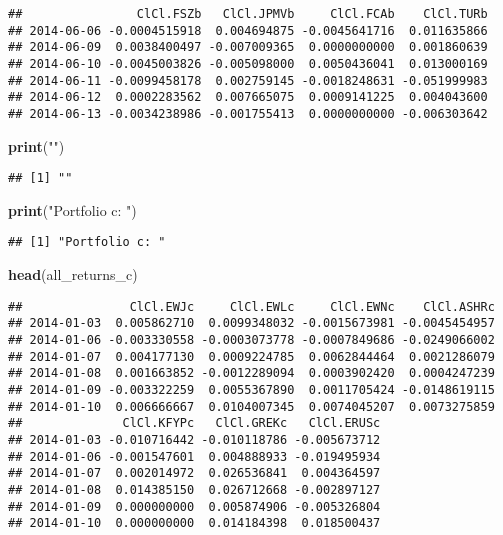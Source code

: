 \documentclass[]{article}
\newenvironment{Shaded}{\begin{snugshade}}{\end{snugshade}}
\newcommand{\KeywordTok}[1]{\textcolor[rgb]{0.13,0.29,0.53}{\textbf{#1}}}
\newcommand{\NormalTok}[1]{#1}
\newcommand{\StringTok}[1]{\textcolor[rgb]{0.31,0.60,0.02}{#1}}
\begin{document}
\begin{verbatim}
##                ClCl.FSZb   ClCl.JPMVb     ClCl.FCAb    ClCl.TURb
## 2014-06-06 -0.0004515918  0.004694875 -0.0045641716  0.011635866
## 2014-06-09  0.0038400497 -0.007009365  0.0000000000  0.001860639
## 2014-06-10 -0.0045003826 -0.005098000  0.0050436041  0.013000169
## 2014-06-11 -0.0099458178  0.002759145 -0.0018248631 -0.051999983
## 2014-06-12  0.0002283562  0.007665075  0.0009141225  0.004043600
## 2014-06-13 -0.0034238986 -0.001755413  0.0000000000 -0.006303642
\end{verbatim}

\begin{Shaded}
\begin{Highlighting}[]
\KeywordTok{print}\NormalTok{(}\StringTok{""}\NormalTok{)}
\end{Highlighting}
\end{Shaded}

\begin{verbatim}
## [1] ""
\end{verbatim}

\begin{Shaded}
\begin{Highlighting}[]
\KeywordTok{print}\NormalTok{(}\StringTok{"Portfolio c: "}\NormalTok{)}
\end{Highlighting}
\end{Shaded}

\begin{verbatim}
## [1] "Portfolio c: "
\end{verbatim}

\begin{Shaded}
\begin{Highlighting}[]
\KeywordTok{head}\NormalTok{(all_returns_c)}
\end{Highlighting}
\end{Shaded}

\begin{verbatim}
##               ClCl.EWJc     ClCl.EWLc     ClCl.EWNc    ClCl.ASHRc
## 2014-01-03  0.005862710  0.0099348032 -0.0015673981 -0.0045454957
## 2014-01-06 -0.003330558 -0.0003073778 -0.0007849686 -0.0249066002
## 2014-01-07  0.004177130  0.0009224785  0.0062844464  0.0021286079
## 2014-01-08  0.001663852 -0.0012289094  0.0003902420  0.0004247239
## 2014-01-09 -0.003322259  0.0055367890  0.0011705424 -0.0148619115
## 2014-01-10  0.006666667  0.0104007345  0.0074045207  0.0073275859
##              ClCl.KFYPc   ClCl.GREKc   ClCl.ERUSc
## 2014-01-03 -0.010716442 -0.010118786 -0.005673712
## 2014-01-06 -0.001547601  0.004888933 -0.019495934
## 2014-01-07  0.002014972  0.026536841  0.004364597
## 2014-01-08  0.014385150  0.026712668 -0.002897127
## 2014-01-09  0.000000000  0.005874906 -0.005326804
## 2014-01-10  0.000000000  0.014184398  0.018500437
\end{verbatim}
\end{document}
